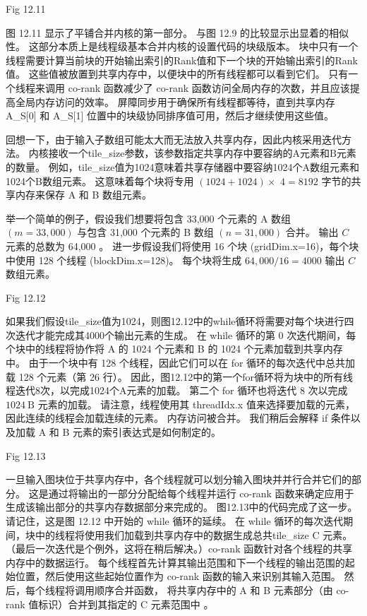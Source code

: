 {\color{red} Fig 12.11}

图 12.11 显示了平铺合并内核的第一部分。 与图 12.9 的比较显示出显着的相似性。 
这部分本质上是线程级基本合并内核的设置代码的块级版本。 
块中只有一个线程需要计算当前块的开始输出索引的Rank值和下一个块的开始输出索引的Rank值。 
这些值被放置到共享内存中，以便块中的所有线程都可以看到它们。 
只有一个线程来调用 co-rank 函数减少了 co-rank 函数访问全局内存的次数，并且应该提高全局内存访问的效率。 
屏障同步用于确保所有线程都等待，直到共享内存 A\_S[0] 和 A\_S[1] 位置中的块级协同排序值可用，然后才继续使用这些值。

回想一下，由于输入子数组可能太大而无法放入共享内存，因此内核采用迭代方法。 
内核接收一个tile\_size参数，该参数指定共享内存中要容纳的$\mathrm{A}$元素和$\mathrm{B}$元素的数量。 
例如，tile\_size值为1024意味着共享存储器中要容纳1024个A数组元素和1024个B数组元素。 
这意味着每个块将专用 $(1024+1024) \times$ $4=8192$ 字节的共享内存来保存 A 和 B 数组元素。

举一个简单的例子，假设我们想要将包含 33,000 个元素的 A 数组 $(m=33,000)$ 
与包含 31,000 个元素的 B 数组 $(n=31,000)$ 合并。 输出 $C$ 元素的总数为 64,000 。 
进一步假设我们将使用 16 个块 (gridDim.x=16)，每个块中使用 128 个线程 (blockDim.x=128)。 
每个块将生成 $64,000 / 16=4000$ 输出 $C$ 数组元素。

{\color{red} Fig 12.12}

如果我们假设tile\_size值为1024，则图12.12中的while循环将需要对每个块进行四次迭代才能完成其4000个输出元素的生成。 
在 while 循环的第 0 次迭代期间，每个块中的线程将协作将 A 的 1024 个元素和 B 的 1024 个元素加载到共享内存中。 
由于一个块中有 128 个线程，因此它们可以在 for 循环的每次迭代中总共加载 128 个元素（第 26 行）。 
因此，图12.12中的第一个for循环将为块中的所有线程迭代8次，以完成1024个A元素的加载。 
第二个 for 循环也将迭代 8 次以完成 $1024 \mathrm{~B}$ 元素的加载。 
请注意，线程使用其 threadIdx.x 值来选择要加载的元素，因此连续的线程会加载连续的元素。 
内存访问被合并。 我们稍后会解释 if 条件以及加载 A 和 B 元素的索引表达式是如何制定的。

{\color{red} Fig 12.13}

一旦输入图块位于共享内存中，各个线程就可以划分输入图块并并行合并它们的部分。 
这是通过将输出的一部分分配给每个线程并运行 co-rank 函数来确定应用于生成该输出部分的共享内存数据部分来完成的。 
图12.13中的代码完成了这一步。 请记住，这是图 12.12 中开始的 while 循环的延续。 
在 while 循环的每次迭代期间，块中的线程将使用我们加载到共享内存中的数据生成总共tile\_size $\mathrm{C}$ 元素。 
（最后一次迭代是个例外，这将在稍后解决。）co-rank 函数针对各个线程的共享内存中的数据运行。 
每个线程首先计算其输出范围和下一个线程的输出范围的起始位置，然后使用这些起始位置作为 co-rank 函数的输入来识别其输入范围。 
然后，每个线程将调用顺序合并函数，
将共享内存中的 $\mathrm{A}$ 和 B 元素部分（由 co-rank 值标识）合并到其指定的 $\mathrm{C}$ 元素范围中 。

